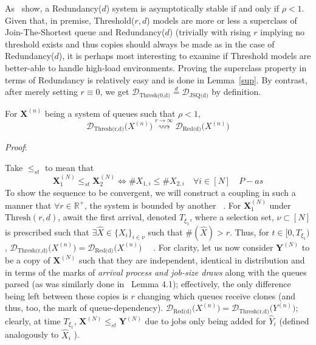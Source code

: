 As~\cite{gardner_redundancy-d_2017} show, a Redundancy($d$) system is asymptotically stable if and only if $\rho < 1 $. Given that, in premise, Threshold($r,d$) models are more or less a superclass of Join-The-Shortest queue and Redundancy($d$) (trivially with rising $r$  implying no threshold exists and thus copies should always be made as in the case of Redundancy($d$), it is perhaps most interesting to examine if Threshold models are better-able to handle high-load environments. Proving the superclass property in terms of Redundancy is relatively easy and is done in Lemma~\ref{sup}. By contrast, after merely setting $r \equiv 0$, we get $ \mathcal{D}_{\text{Thresh(0,d)}} \overset{d}{=} \mathcal{D}_{\text{JSQ(d)}}$ by definition.


\begin{lemma}
    \label{sup}
    For $\mathbf{X}^{(n)}$ being a system of queues such that $\rho < 1$, \[\mathcal{D}_{\text{Thresh(r,d)}}\mathbf(X^{(n)}) \overset{r \rightarrow \infty}{\rightsquigarrow} \mathcal{D}_{\text{Red(d)}}\mathbf(X^{(n)})\]
\end{lemma}
\textit{Proof}:

Take $\leq_{st}$ to mean that~\cite{bramson_asymptotic_2012}
\[\mathbf{X}_{1}^{(N)}\leq_{st}\mathbf{X}_{2}^{(N)} \iff\# X_{1,i} \leq \# X_{2,i}  \quad \forall i \in [N] \quad P-as\]
To show the sequence to be convergent, we will construct a coupling in such a manner that $\forall r \in \mathbb{R}^{+}$,  the system is bounded by another~\cite{baccelli_elements_2003} . For $\mathbf{X}_{1}^{(N)}$ under $\text{Thresh}(r,d)$, await the first arrival, denoted $T_{\xi_{1}}$, where a selection set, $\nu \subset [N] $ is prescribed such that $\exists \hat X \in \{X_{i}\}_{i \in \nu} $ such that $ \# (\hat X) > r $. Thus, for  $ t \in [0,T_{\xi_{1}})$, $\mathcal{D}_{\text{Thresh(r,d)}}\mathbf(X^{(n)}) = \mathcal{D}_{\text{Red(d)}}\mathbf(X^{(n)}) \quad$ . For clarity, let us now consider $\mathbf{Y}^{(N)}$ to be a copy of  $\mathbf{X}^{(N)}$ such that they are independent, identical in distribution and in terms of the marks of \textit{arrival process and job-size draws} along with the queues parsed (as was similarly done in~\cite{bramson_asymptotic_2012} Lemma 4.1); effectively, the only difference being left between these copies is $r$ changing which queues receive clones (and thus, too, the mark of queue-dependency).  $\mathcal{D}_{\text{Red(d)}}\mathbf(X^{(n)}) = \mathcal{D}_{\text{Thresh(r,d)}}\mathbf(Y^{(n)}) $; clearly, at time $T_{\xi_{1}}$, $\mathbf{X}^{(N)}\leq_{st}\mathbf{Y}^{(N)} $
due to jobs only being added for ${\hat Y_{i}}$ (defined analogously to  ${\hat X_{i}}$ ).

